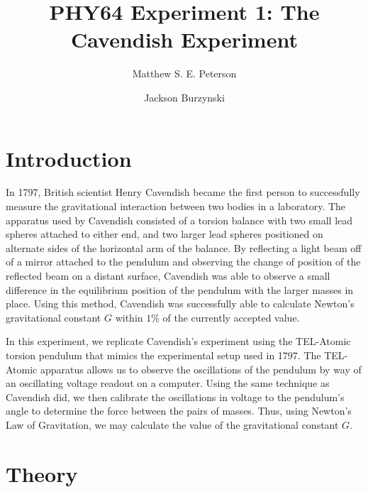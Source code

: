 \documentclass[aps, reprint,amsmath,amssymb]{revtex4-1} %
\begin{document}
\title{PHY64 Experiment 1: The Cavendish Experiment}
\author{Matthew S. E. Peterson}
\author{Jackson Burzynski}
\maketitle

\section{Introduction}

In 1797, British scientist Henry Cavendish became the first person to
successfully measure the gravitational interaction between two bodies in a
laboratory. The apparatus used by Cavendish consisted of a torsion balance
with two small lead spheres attached to either end, and two larger lead
spheres positioned on alternate sides of the horizontal arm of the balance.
By reflecting a light beam off of a mirror attached to the pendulum and
observing the change of position of the reflected beam on a distant
surface, Cavendish was able to observe a small difference in the
equilibrium position of the pendulum with the larger masses in place. Using
this method, Cavendish was successfully able to calculate Newton's
gravitational constant $G$ within $1\%$ of the currently accepted value. 

In this experiment, we replicate Cavendish's experiment using the
TEL-Atomic torsion pendulum that mimics the experimental setup used in
1797. The TEL-Atomic apparatus allows us to observe the oscillations of the
pendulum by way of an oscillating voltage readout on a computer. Using the
same technique as Cavendish did, we then calibrate the oscillations in
voltage to the pendulum's angle to determine the force between the pairs of
masses. Thus, using Newton's Law of Gravitation, we may calculate the value
of the gravitational constant $G$.

\section{Theory}
\end{document}
